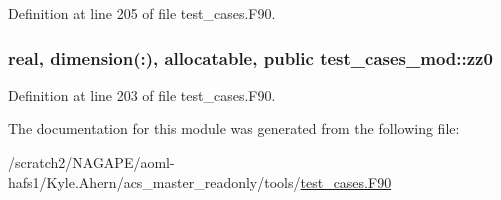 Definition at line 205 of file test\-\_\-cases.\-F90.

\subsubsection[{zz0}]{\setlength{\rightskip}{0pt plus 5cm}real, dimension(\-:), allocatable, public test\-\_\-cases\-\_\-mod\-::zz0}\label{classtest__cases__mod_a086960ce4bdf89402a7595af28e5d04a}


Definition at line 203 of file test\-\_\-cases.\-F90.



The documentation for this module was generated from the following file\-:\begin{DoxyCompactItemize}
\item 
/scratch2/\-N\-A\-G\-A\-P\-E/aoml-\/hafs1/\-Kyle.\-Ahern/acs\-\_\-master\-\_\-readonly/tools/\hyperlink{test__cases_8F90}{test\-\_\-cases.\-F90}\end{DoxyCompactItemize}
